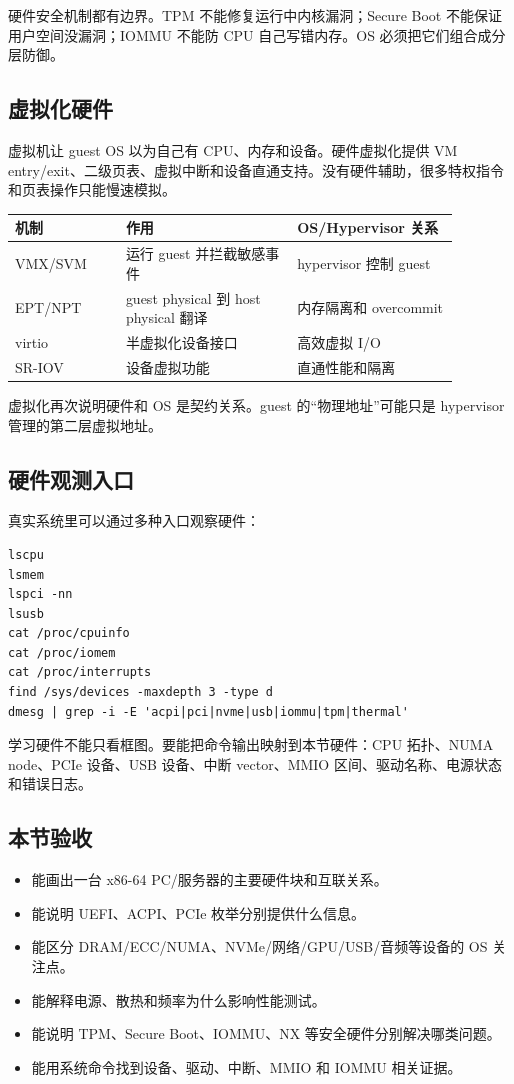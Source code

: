 硬件安全机制都有边界。TPM 不能修复运行中内核漏洞；Secure Boot 不能保证用户空间没漏洞；IOMMU 不能防 CPU 自己写错内存。OS 必须把它们组合成分层防御。

\subsection{虚拟化硬件}

虚拟机让 guest OS 以为自己有 CPU、内存和设备。硬件虚拟化提供 VM entry/exit、二级页表、虚拟中断和设备直通支持。没有硬件辅助，很多特权指令和页表操作只能慢速模拟。

\begin{longtable}{p{0.22\linewidth}p{0.34\linewidth}p{0.32\linewidth}}
\toprule
机制 & 作用 & OS/Hypervisor 关系 \\
\midrule
VMX/SVM & 运行 guest 并拦截敏感事件 & hypervisor 控制 guest \\
EPT/NPT & guest physical 到 host physical 翻译 & 内存隔离和 overcommit \\
virtio & 半虚拟化设备接口 & 高效虚拟 I/O \\
SR-IOV & 设备虚拟功能 & 直通性能和隔离 \\
\bottomrule
\end{longtable}

虚拟化再次说明硬件和 OS 是契约关系。guest 的“物理地址”可能只是 hypervisor 管理的第二层虚拟地址。

\subsection{硬件观测入口}

真实系统里可以通过多种入口观察硬件：

\begin{lstlisting}
lscpu
lsmem
lspci -nn
lsusb
cat /proc/cpuinfo
cat /proc/iomem
cat /proc/interrupts
find /sys/devices -maxdepth 3 -type d
dmesg | grep -i -E 'acpi|pci|nvme|usb|iommu|tpm|thermal'
\end{lstlisting}

学习硬件不能只看框图。要能把命令输出映射到本节硬件：CPU 拓扑、NUMA node、PCIe 设备、USB 设备、中断 vector、MMIO 区间、驱动名称、电源状态和错误日志。

\subsection{本节验收}

\begin{rubricbox}
\begin{itemize}
\tightlist
\item 能画出一台 x86-64 PC/服务器的主要硬件块和互联关系。
\item 能说明 UEFI、ACPI、PCIe 枚举分别提供什么信息。
\item 能区分 DRAM/ECC/NUMA、NVMe/网络/GPU/USB/音频等设备的 OS 关注点。
\item 能解释电源、散热和频率为什么影响性能测试。
\item 能说明 TPM、Secure Boot、IOMMU、NX 等安全硬件分别解决哪类问题。
\item 能用系统命令找到设备、驱动、中断、MMIO 和 IOMMU 相关证据。
\end{itemize}
\end{rubricbox}
